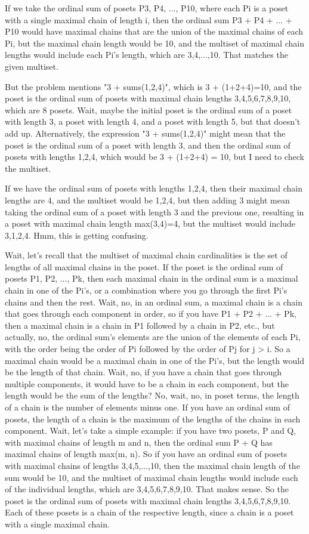 If we take the ordinal sum of posets P3, P4, ..., P10, where each Pi is a poset with a single maximal chain of length i, then the ordinal sum P3 + P4 + ... + P10 would have maximal chains that are the union of the maximal chains of each Pi, but the maximal chain length would be 10, and the multiset of maximal chain lengths would include each Pi's length, which are 3,4,...,10. That matches the given multiset. 

But the problem mentions "3 + sums({1,2,4})", which is 3 + (1+2+4)=10, and the poset is the ordinal sum of posets with maximal chain lengths 3,4,5,6,7,8,9,10, which are 8 posets. Wait, maybe the initial poset is the ordinal sum of a poset with length 3, a poset with length 4, and a poset with length 5, but that doesn't add up. Alternatively, the expression "3 + sums({1,2,4})" might mean that the poset is the ordinal sum of a poset with length 3, and then the ordinal sum of posets with lengths 1,2,4, which would be 3 + (1+2+4) = 10, but I need to check the multiset. 

If we have the ordinal sum of posets with lengths 1,2,4, then their maximal chain lengths are 4, and the multiset would be {1,2,4}, but then adding 3 might mean taking the ordinal sum of a poset with length 3 and the previous one, resulting in a poset with maximal chain length max(3,4)=4, but the multiset would include 3,1,2,4. Hmm, this is getting confusing. 

Wait, let's recall that the multiset of maximal chain cardinalities is the set of lengths of all maximal chains in the poset. If the poset is the ordinal sum of posets P1, P2, ..., Pk, then each maximal chain in the ordinal sum is a maximal chain in one of the Pi's, or a combination where you go through the first Pi's chains and then the rest. Wait, no, in an ordinal sum, a maximal chain is a chain that goes through each component in order, so if you have P1 + P2 + ... + Pk, then a maximal chain is a chain in P1 followed by a chain in P2, etc., but actually, no, the ordinal sum's elements are the union of the elements of each Pi, with the order being the order of Pi followed by the order of Pj for j > i. So a maximal chain would be a maximal chain in one of the Pi's, but the length would be the length of that chain. Wait, no, if you have a chain that goes through multiple components, it would have to be a chain in each component, but the length would be the sum of the lengths? No, wait, no, in poset terms, the length of a chain is the number of elements minus one. If you have an ordinal sum of posets, the length of a chain is the maximum of the lengths of the chains in each component. Wait, let's take a simple example: if you have two posets, P and Q, with maximal chains of length m and n, then the ordinal sum P + Q has maximal chains of length max(m, n). So if you have an ordinal sum of posets with maximal chains of lengths 3,4,5,...,10, then the maximal chain length of the sum would be 10, and the multiset of maximal chain lengths would include each of the individual lengths, which are 3,4,5,6,7,8,9,10. That makes sense. So the poset is the ordinal sum of posets with maximal chain lengths 3,4,5,6,7,8,9,10. Each of these posets is a chain of the respective length, since a chain is a poset with a single maximal chain. 

